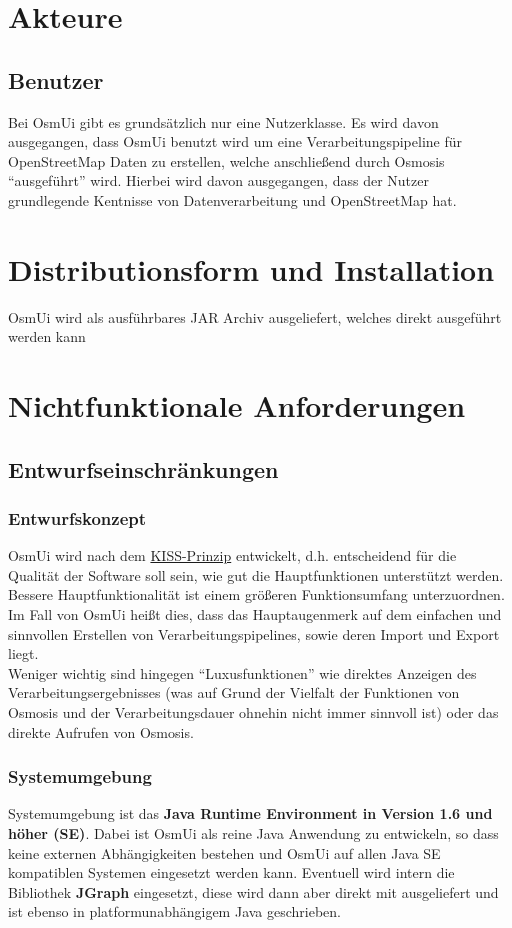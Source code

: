 \documentclass[a4paper,12pt]{scrartcl}
\begin{document}
\section{Akteure}
\subsection{Benutzer}
Bei OsmUi gibt es grundsätzlich nur eine Nutzerklasse. Es wird davon ausgegangen, dass OsmUi benutzt wird um eine Verarbeitungspipeline für OpenStreetMap Daten
zu erstellen, welche anschließend durch Osmosis ``ausgeführt'' wird. Hierbei wird davon ausgegangen, dass der Nutzer grundlegende Kentnisse 
von Datenverarbeitung und OpenStreetMap hat.

\section{Distributionsform und Installation}
OsmUi wird als ausführbares JAR Archiv ausgeliefert, welches direkt ausgeführt werden kann

\section{Nichtfunktionale Anforderungen}
\subsection{Entwurfseinschränkungen}
\subsubsection{Entwurfskonzept}
OsmUi wird nach dem \href{http://de.wikipedia.org/wiki/KISS-Prinzip}{KISS-Prinzip} entwickelt, d.h. entscheidend für die Qualität der Software soll
sein, wie gut die Hauptfunktionen unterstützt werden. Bessere Hauptfunktionalität ist einem größeren Funktionsumfang unterzuordnen.\\
Im Fall von OsmUi heißt dies, dass das Hauptaugenmerk auf dem einfachen und sinnvollen Erstellen von Verarbeitungspipelines, sowie deren Import und Export liegt.\\
Weniger wichtig sind hingegen ``Luxusfunktionen'' wie direktes Anzeigen des Verarbeitungsergebnisses (was auf Grund der Vielfalt der Funktionen von Osmosis
und der Verarbeitungsdauer ohnehin nicht immer sinnvoll ist) oder das direkte Aufrufen von Osmosis.
\subsubsection{Systemumgebung}
Systemumgebung ist das \textbf{Java Runtime Environment in Version 1.6 und höher (SE)}. Dabei ist OsmUi als reine Java Anwendung zu entwickeln, so dass
keine externen Abhängigkeiten bestehen und OsmUi auf allen Java SE kompatiblen Systemen eingesetzt werden kann.
Eventuell wird intern die Bibliothek \textbf{JGraph} eingesetzt, diese wird dann aber direkt mit ausgeliefert
und ist ebenso in platformunabhängigem Java geschrieben. 
\end{document}

